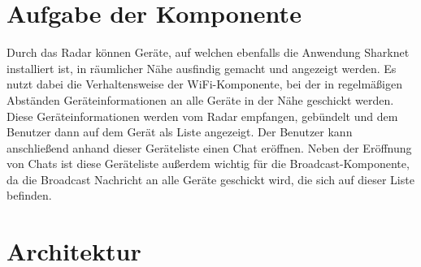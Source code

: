 \section{Aufgabe der Komponente}
Durch das Radar können Geräte, auf welchen ebenfalls die Anwendung Sharknet installiert ist, in räumlicher Nähe ausfindig gemacht und angezeigt werden. Es nutzt dabei die Verhaltensweise der WiFi-Komponente, bei der in regelmäßigen Abständen Geräteinformationen an alle Geräte in der Nähe geschickt werden. Diese Geräteinformationen werden vom Radar empfangen, gebündelt und dem Benutzer dann auf dem Gerät als Liste angezeigt. Der Benutzer kann anschließend anhand dieser Geräteliste einen Chat eröffnen. Neben der Eröffnung von Chats ist diese Geräteliste außerdem wichtig für die Broadcast-Komponente, da die Broadcast Nachricht an alle Geräte geschickt wird, die sich auf dieser Liste befinden.

\section{Architektur}

